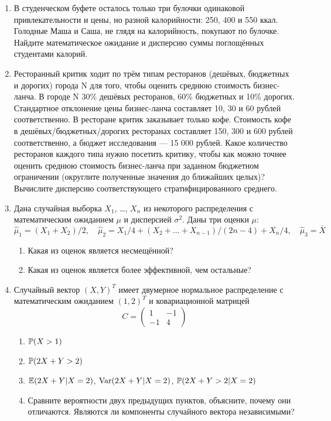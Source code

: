 \begin{enumerate}

\item В студенческом буфете осталось только три булочки одинаковой привлекательности
и цены, но разной калорийности: 250, 400 и 550 ккал. Голодные Маша и Саша, не глядя
на калорийность, покупают по булочке. Найдите математическое ожидание и дисперсию
суммы поглощённых студентами калорий.

\item Ресторанный критик ходит по трём типам ресторанов (дешёвых, бюджетных и дорогих)
города N для того, чтобы оценить среднюю стоимость бизнес-ланча. В городе N 30\%
дешёвых ресторанов, 60\% бюджетных  и 10\% дорогих. Стандартное отклонение цены
бизнес-ланча составляет 10, 30 и 60 рублей соответственно. В ресторане критик
заказывает только кофе.  Стоимость кофе в дешёвых/бюджетных/дорогих ресторанах
составляет 150, 300 и 600 рублей соответственно, а бюджет  исследования — 15 000
рублей. Какое количество ресторанов каждого типа нужно посетить критику, чтобы
как можно точнее оценить среднюю стоимость бизнес-ланча при заданном бюджетном
ограничении (округлите полученные значения до ближайших целых)? Вычислите дисперсию
соответствующего стратифицированного среднего.

\item Дана случайная выборка $X_1$, \ldots, $X_n$  из некоторого распределения
с математическим ожиданием $\mu$ и дисперсией $\sigma^2$. Даны три оценки $\mu$:
 \[
\hat\mu_1 = (X_1 + X_2)/2, \quad \hat\mu_2 = X_1/4 + (X_2 + \ldots + X_{n-1})/(2n-4)
+ X_n/4, \quad \hat\mu_3 = \bar X
 \]
\begin{enumerate}
\item Какая из оценок является несмещённой?
\item Какая из оценок является более эффективной, чем остальные?
\end{enumerate}

\item Случайный вектор $(X, Y)^T$ имеет двумерное нормальное распределение
с математическим ожиданием  $(1, 2)^T$ и ковариационной матрицей
\[
C=\begin{pmatrix}
1 & -1 \\
-1 & 4
\end{pmatrix}
\]
\begin{enumerate}
\item $\P(X>1)$
\item $\P(2X+Y>2)$
\item $\E(2X+Y|X=2)$, $\Var(2X+Y|X=2)$, $\P(2X+Y>2|X=2)$
\item Сравните вероятности двух предыдущих пунктов, объясните, почему они отличаются.
Являются ли компоненты случайного вектора независимыми?
\end{enumerate}



\end{enumerate}
